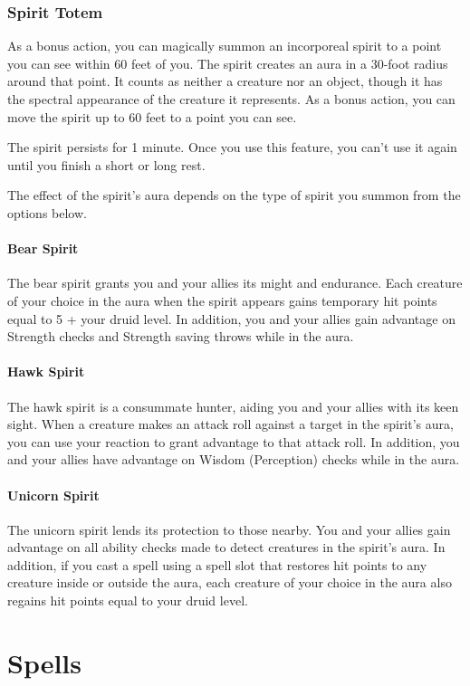 \documentclass[letterpaper,openany,oneside,twocolumn]{book}
\begin{document}
\subsubsection*{Spirit Totem}
As a bonus action, you can magically summon an incorporeal spirit to a point you can see within 60 feet of you. The spirit creates an aura in a 30-foot radius around that point. It counts as neither a creature nor an object, though it has the spectral appearance of the creature it represents. As a bonus action, you can move the spirit up to 60 feet to a point you can see.

The spirit persists for 1 minute. Once you use this feature, you can't use it again until you finish a short or long rest.

The effect of the spirit's aura depends on the type of spirit you summon from the options below.

\paragraph*{Bear Spirit} The bear spirit grants you and your allies its might and endurance. Each creature of your choice in the aura when the spirit appears gains temporary hit points equal to 5 + your druid level. In addition, you and your allies gain advantage on Strength checks and Strength saving throws while in the aura.

\paragraph*{Hawk Spirit} The hawk spirit is a consummate hunter, aiding you and your allies with its keen sight. When a creature makes an attack roll against a target in the spirit's aura, you can use your reaction to grant advantage to that attack roll. In addition, you and your allies have advantage on Wisdom (Perception) checks while in the aura.

\paragraph*{Unicorn Spirit} The unicorn spirit lends its protection to those nearby. You and your allies gain advantage on all ability checks made to detect creatures in the spirit's aura. In addition, if you cast a spell using a spell slot that restores hit points to any creature inside or outside the aura, each creature of your choice in the aura also regains hit points equal to your druid level.

\section*{Spells}
\end{document}
